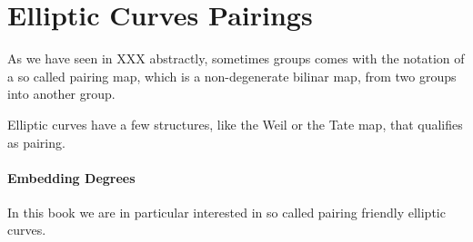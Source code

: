 
\section{Elliptic Curves Pairings} As we have seen in XXX abstractly, sometimes groups comes with the notation of a so called pairing map, which is a non-degenerate bilinar map, from two groups into another group.

Elliptic curves have a few structures, like the Weil or the Tate map, that qualifies as pairing.   

\paragraph{Embedding Degrees}In this book we are in particular interested in so called pairing friendly elliptic curves. 

